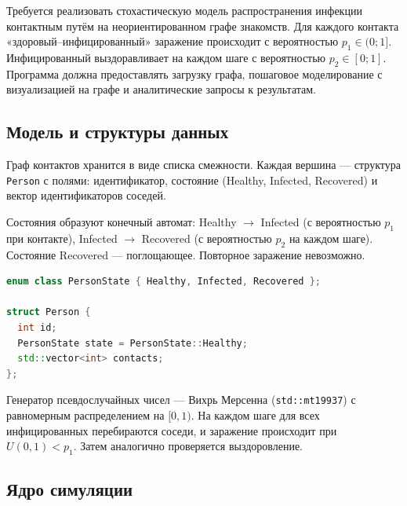 \documentclass[14pt,a4paper]{extarticle}
\begin{document}
Требуется реализовать стохастическую модель распространения инфекции
контактным путём на неориентированном графе знакомств. Для каждого контакта
«здоровый–инфицированный» заражение происходит с вероятностью $p_1 \in (0; 1]$.
Инфицированный выздоравливает на каждом шаге с вероятностью $p_2 \in [0; 1]$.
Программа должна предоставлять загрузку графа, пошаговое моделирование с
визуализацией на графе и аналитические запросы к результатам.


\subsection{Модель и структуры данных}

Граф контактов хранится в виде списка смежности. Каждая вершина — структура
\texttt{Person} с полями: идентификатор, состояние (Healthy, Infected,
Recovered) и вектор идентификаторов соседей.


Состояния образуют конечный автомат: Healthy $\to$ Infected (с вероятностью
$p_1$ при контакте), Infected $\to$ Recovered (с вероятностью $p_2$ на каждом
шаге). Состояние Recovered — поглощающее. Повторное заражение невозможно.


\begin{lstlisting}[language=C++, caption={Структура вершины и состояния эпидемиологической модели}, label=lst.person_struct]
enum class PersonState { Healthy, Infected, Recovered };

struct Person {
  int id;
  PersonState state = PersonState::Healthy;
  std::vector<int> contacts;
};
\end{lstlisting}

Генератор псевдослучайных чисел — Вихрь Мерсенна (\texttt{std::mt19937})
с равномерным распределением на $[0, 1)$. На каждом шаге для всех
инфицированных перебираются соседи, и заражение происходит при
$U(0,1) < p_1$. Затем аналогично проверяется выздоровление.


\subsection{Ядро симуляции}
\end{document}
